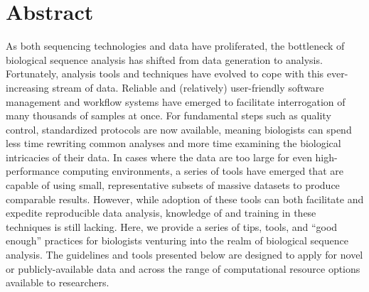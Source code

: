\documentclass[10pt,letterpaper]{article}
\begin{document}
\section*{Abstract}
As both sequencing technologies and data have proliferated, the bottleneck of biological sequence analysis has shifted from data generation to analysis. 
Fortunately, analysis tools and techniques have evolved to cope with this ever-increasing stream of data. 
Reliable and (relatively) user-friendly software management and workflow systems have emerged to facilitate interrogation of many thousands of samples at once. 
For fundamental steps such as quality control, standardized protocols are now available, meaning biologists can spend less time rewriting common analyses and more time examining the biological intricacies of their data. 
In cases where the data are too large for even high-performance computing environments, a series of tools have emerged that are capable of using small, representative subsets of massive datasets to produce comparable results. 
However, while adoption of these tools can both facilitate and expedite reproducible data analysis, knowledge of and training in these techniques is still lacking. 
Here, we provide a series of tips, tools, and “good enough” practices for biologists venturing into the realm of biological sequence analysis.
The guidelines and tools presented below are designed to apply for novel or publicly-available data and across the range of computational resource options available to researchers.



\end{document}

